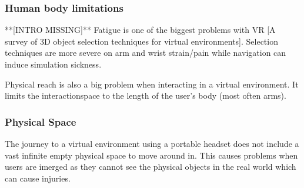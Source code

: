\subsubsection{Human body limitations}
**[INTRO MISSING]**
Fatigue is one of the biggest problems with VR [A survey of 3D object selection techniques for virtual environments].
Selection techniques are more severe on arm and wrist strain/pain while navigation can induce simulation sickness.

Physical reach is also a big problem when interacting in a virtual environment. It limits the interactionspace to the length of the user's body (most often arms).

\subsubsection{Physical Space}
The journey to a virtual environment using a portable headset does not include a vast infinite empty physical space to move around in. This causes problems when users are imerged as they cannot see the physical objects in the real world which can cause injuries.
